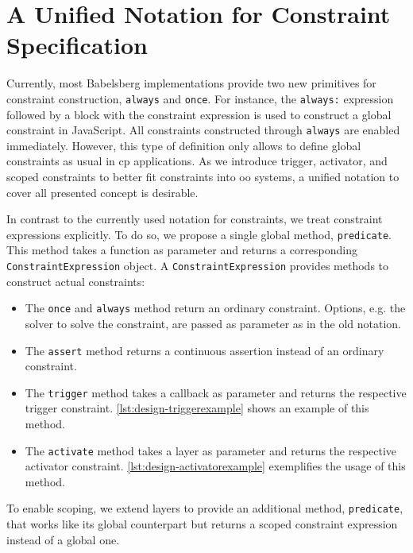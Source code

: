 
\section{A Unified Notation for Constraint Specification}
\label{sec:design-unifiedsyntax}
Currently, most Babelsberg implementations provide two new primitives for constraint construction, \texttt{always} and \texttt{once}.
For instance, the \texttt{always:} expression followed by a block with the constraint expression is used to construct a global constraint in JavaScript. All constraints constructed through \texttt{always} are enabled immediately.
However, this type of definition only allows to define global constraints as usual in \gls{cp} applications.
As we introduce trigger, activator, and scoped constraints to better fit constraints into \gls{oo} systems, a unified notation to cover all presented concept is desirable.

In contrast to the currently used notation for constraints, we treat constraint expressions explicitly.
To do so, we propose a single global method, \texttt{predicate}. This method takes a function as parameter and returns a corresponding \texttt{ConstraintExpression} object.
A \texttt{ConstraintExpression} provides methods to construct actual constraints:
\begin{itemize}
\item The \texttt{once} and  \texttt{always} method return an ordinary constraint. Options, e.g. the solver to solve the constraint, are passed as parameter as in the old notation.
\item The \texttt{assert} method returns a continuous assertion instead of an ordinary constraint.
\item The \texttt{trigger} method takes a callback as parameter and returns the respective trigger constraint. \autoref{lst:design-triggerexample} shows an example of this method.
\item The \texttt{activate} method takes a layer as parameter and returns the respective activator constraint. \autoref{lst:design-activatorexample} exemplifies the usage of this method.
\end{itemize}
To enable scoping, we extend layers to provide an additional method, \texttt{predicate}, that works like its global counterpart but returns a scoped constraint expression instead of a global one.

